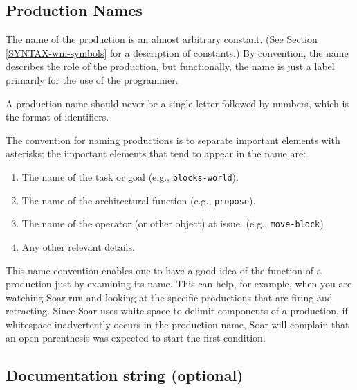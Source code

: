 \subsection{Production Names}

The name of the production is  an almost arbitrary constant. (See Section \ref{SYNTAX-wm-symbols} for a description of constants.) By convention, the name describes the role of the production, but functionally, the name is just a label primarily for the use of the programmer. 

A production name should never be a single letter followed by numbers, which is the format of identifiers.

The convention for naming productions is to separate important elements with asterisks; the important elements that tend to appear in the name are:

\vspace{-12pt}
\begin{enumerate}
\item The name of the task or goal (e.g., \texttt{blocks-world}).
	\vspace{-10pt}
\item The name of the architectural function (e.g., \texttt{propose}).
	\vspace{-10pt}
\item The name of the operator (or other object) at issue. (e.g., \texttt{move-block})
	\vspace{-10pt} 
\item Any other relevant details.
	\vspace{-10pt}
\end{enumerate}

This name convention enables one to have a good idea of the function of a production just by examining its name. This can help, for example, when you are watching Soar run and looking at the specific productions that are firing and retracting.  Since Soar uses white space to delimit components of a production, if whitespace inadvertently occurs in the production name, Soar will complain that an open parenthesis was expected to start the first condition.

\subsection{Documentation string (optional)}

